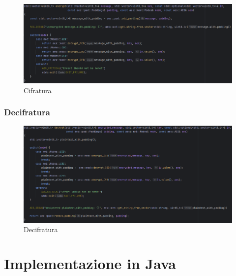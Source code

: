 \textsf{\small }

\begin{figure}[H]
	\centering
	\includegraphics[width=1\textwidth, height=1\textheight, keepaspectratio]{./images/code/cpp/api/encrypt.PNG}
	\caption{Cifratura}
	\label{fig:encrypt}
\end{figure}

\subsubsection{Decifratura}

\textsf{\small }

\begin{figure}[H]
	\centering
	\includegraphics[width=1\textwidth, height=1\textheight, keepaspectratio]{./images/code/cpp/api/decrypt.PNG}
	\caption{Decifratura}
	\label{fig:decrypt}
\end{figure}

\textsf{\small } %


\section{Implementazione in Java}

\textsf{\small } %

